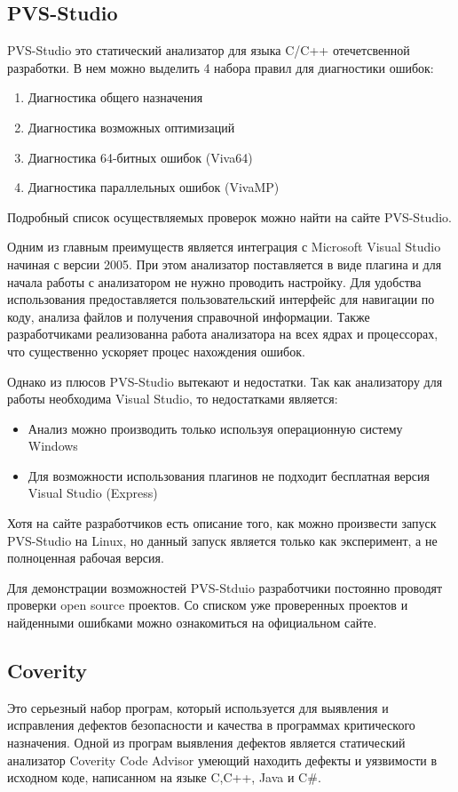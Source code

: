 \subsection{PVS-Studio}
PVS-Studio это статический анализатор для языка C/C++ отечетсвенной разработки. В нем можно 
выделить 4 набора правил для диагностики ошибок:
\begin{enumerate}
	\item Диагностика общего назначения
	\item Диагностика возможных оптимизаций
	\item Диагностика 64-битных ошибок (Viva64)
	\item Диагностика параллельных ошибок (VivaMP)
\end{enumerate}
Подробный список осуществляемых проверок можно найти на сайте PVS-Studio.

Одним из главным преимуществ является интеграция с Microsoft Visual Studio начиная с версии 2005.
При этом анализатор поставляется в виде плагина и для начала работы с анализатором не нужно
проводить настройку. Для удобства использования предоставляется пользовательский интерфейс для 
навигации по коду, анализа файлов и получения справочной информации. Также разработчиками реализованна 
работа анализатора на всех ядрах и процессорах, что существенно ускоряет процес нахождения ошибок.

Однако из плюсов PVS-Studio вытекают и недостатки. Так как анализатору для работы необходима  
Visual Studio, то недостатками является:
\begin{itemize}
 \item Анализ можно производить только используя операционную систему Windows
 \item Для возможности использования плагинов не подходит бесплатная версия Visual Studio (Express)     
\end{itemize}

Хотя на сайте разработчиков есть описание того, как можно произвести запуск PVS-Studio на Linux, 
но данный запуск является только как эксперимент, а не полноценная рабочая версия.

Для демонстрации возможностей PVS-Stduio разработчики постоянно проводят проверки open source 
проектов. Со списком уже проверенных проектов и найденными ошибками можно ознакомиться на официальном сайте.

\subsection{Coverity}
Это серьезный набор програм, который используется для выявления и исправления дефектов безопасности
и качества в программах критического назначения. Одной из програм выявления дефектов является
статический анализатор Coverity Code Advisor умеющий находить дефекты и уязвимости в исходном коде, 
написанном на языке C,C++, Java и C\#.  

